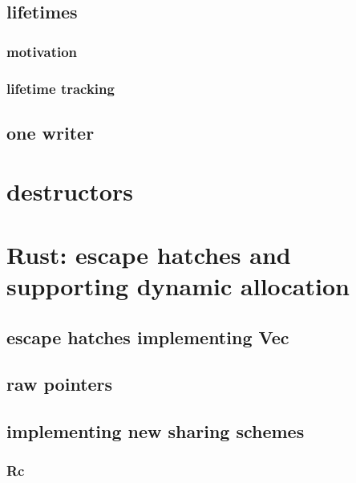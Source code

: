 \subsection{lifetimes}
\subsubsection{motivation}


\subsubsection{lifetime tracking}


\subsection{one writer}




\section{destructors}


\section{Rust: escape hatches and supporting dynamic allocation}


\subsection{escape hatches implementing Vec}


\subsection{raw pointers}



\subsection{implementing new sharing schemes}
\subsubsection{Rc}


